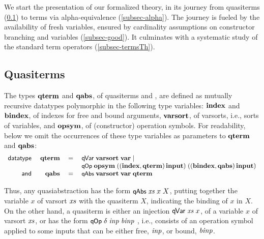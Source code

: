 \documentclass{llncs}
\begin{document}
We start the presentation of our formalized theory, in its journey 
from quasiterms (\ref{subsec-qterms}) to terms via alpha-equivalence (\ref{subsec-alpha}). 
The journey is fueled by the availability of fresh variables, 
ensured by cardinality assumptions on constructor branching 
 and variables (\ref{subsec-good}).   
%
It culminates with a systematic   
study of the standard term operators %
(\ref{subsec-termsTh}). 


\subsection{Quasiterms}
\label{subsec-qterms}

The types $\mbox{\bf qterm}$ and $\mbox{\bf qabs}$, of quasiterms and \abstractions{}, are defined as mutually recursive datatypes 
polymorphic in the following type variables: $\mbox{\bf index}$ and $\mbox{\bf bindex}$, of indexes for 
free and bound arguments, $\mbox{\bf varsort}$, of varsorts, i.e., sorts of variables, 
and $\mbox{\bf opsym}$, of (constructor) operation symbols. 
For readability, below we omit the occurrences of these type variables as parameters to $\mbox{\bf qterm}$ and $\mbox{\bf qabs}$: 
%
$$
\begin{array}{rrcl}
\textsf{datatype } &
  \mbox{\bf qterm} &\;=\;& \mbox{\rm\textsf{q\hspace*{-0.2ex}Var}}\;\mbox{\bf varsort}\;\mbox{\bf var}  \mid 
            \\
         &&&
   \mbox{\rm\textsf{\small q\hspace*{-0.1ex}Op}}\;\mbox{\bf opsym}\;((\mbox{\bf index},\mbox{\bf qterm})\,\mbox{\bf input})\;((\mbox{\bf bindex},\mbox{\bf qabs})\,\mbox{\bf input})
\\
\textsf{and } &
  \mbox{\bf qabs} &\;=\;& \mbox{\rm\textsf{\small q\hspace*{-0.1ex}Abs}}\;\mbox{\bf varsort}\;\mbox{\bf var}\;\mbox{\bf qterm}
\end{array}
$$
%
\par
%
Thus, any quasiabstraction has the form $\mbox{\rm\textsf{\small q\hspace*{-0.1ex}Abs}}\;\mbox{\textit{xs}}\;x\;X$, putting together the variable $x$ %
of varsort $\mbox{\textit{xs}}$ 
with the quasiterm $X$, indicating the binding of $x$ in $X$. 
On the other hand, 
a quasiterm is either an injection $\mbox{\rm\textsf{q\hspace*{-0.2ex}Var}}\;\mbox{\textit{xs}}\;x$, of a variable $x$ of varsort $\mbox{\textit{xs}}$, 
or has the form $\mbox{\rm\textsf{\small q\hspace*{-0.1ex}Op}}\;\delta\;\mbox{\textit{inp}}\;\mbox{\textit{binp}}$ , i.e., consists of 
an operation symbol %
applied to %
some inputs that can be either free, $\mbox{\textit{inp}}$, or bound, $\mbox{\textit{binp}}$. 
%
\end{document}
